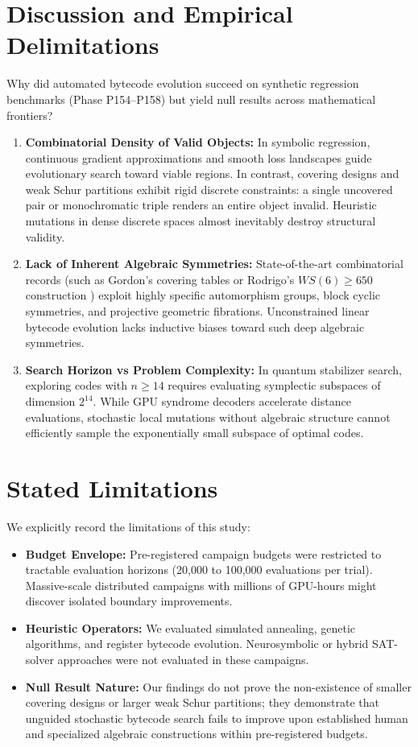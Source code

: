 \documentclass[11pt,a4paper]{article}
\begin{document}
\section{Discussion and Empirical Delimitations}
\label{sec:discussion}
Why did automated bytecode evolution succeed on synthetic regression benchmarks (Phase P154--P158) but yield null results across mathematical frontiers?
\begin{enumerate}
    \item \textbf{Combinatorial Density of Valid Objects:} In symbolic regression, continuous gradient approximations and smooth loss landscapes guide evolutionary search toward viable regions. In contrast, covering designs and weak Schur partitions exhibit rigid discrete constraints: a single uncovered pair or monochromatic triple renders an entire object invalid. Heuristic mutations in dense discrete spaces almost inevitably destroy structural validity.
    \item \textbf{Lack of Inherent Algebraic Symmetries:} State-of-the-art combinatorial records (such as Gordon's covering tables or Rodrigo's $WS(6) \ge 650$ construction \cite{rodrigo2026weakschur}) exploit highly specific automorphism groups, block cyclic symmetries, and projective geometric fibrations. Unconstrained linear bytecode evolution lacks inductive biases toward such deep algebraic symmetries.
    \item \textbf{Search Horizon vs Problem Complexity:} In quantum stabilizer search, exploring codes with $n \ge 14$ requires evaluating symplectic subspaces of dimension $2^{14}$. While GPU syndrome decoders accelerate distance evaluations, stochastic local mutations without algebraic structure cannot efficiently sample the exponentially small subspace of optimal codes.
\end{enumerate}

\section{Stated Limitations}
\label{sec:limitations}
We explicitly record the limitations of this study:
\begin{itemize}
    \item \textbf{Budget Envelope:} Pre-registered campaign budgets were restricted to tractable evaluation horizons (20,000 to 100,000 evaluations per trial). Massive-scale distributed campaigns with millions of GPU-hours might discover isolated boundary improvements.
    \item \textbf{Heuristic Operators:} We evaluated simulated annealing, genetic algorithms, and register bytecode evolution. Neurosymbolic or hybrid SAT-solver approaches \cite{heule2017schur} were not evaluated in these campaigns.
    \item \textbf{Null Result Nature:} Our findings do not prove the non-existence of smaller covering designs or larger weak Schur partitions; they demonstrate that unguided stochastic bytecode search fails to improve upon established human and specialized algebraic constructions within pre-registered budgets.
\end{itemize}
\end{document}
